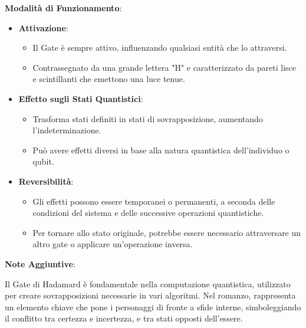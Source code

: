 \begin{tcolorbox}[fontupper=\tiny, fontlower=\Large,colback=white,colframe=black,title=\textbf{Gate di Hadamard}]
\begin{multicols}{2}
\textbf{Modalità di Funzionamento}:

\begin{itemize}
    \item \textbf{Attivazione}:
    \begin{itemize}
        \item Il Gate è sempre attivo, influenzando qualsiasi entità che lo attraversi.
        \item Contrassegnato da una grande lettera "H" e caratterizzato da pareti lisce e scintillanti che emettono una luce tenue.
    \end{itemize}
    \item \textbf{Effetto sugli Stati Quantistici}:
    \begin{itemize}
        \item Trasforma stati definiti in stati di sovrapposizione, aumentando l'indeterminazione.
        \item Può avere effetti diversi in base alla natura quantistica dell'individuo o qubit.
    \end{itemize}
    \item \textbf{Reversibilità}:
    \begin{itemize}
        \item Gli effetti possono essere temporanei o permanenti, a seconda delle condizioni del sistema e delle successive operazioni quantistiche.
        \item Per tornare allo stato originale, potrebbe essere necessario attraversare un altro gate o applicare un'operazione inversa.
    \end{itemize}
\end{itemize}

\textbf{Note Aggiuntive}:

Il Gate di Hadamard è fondamentale nella computazione quantistica, utilizzato per creare sovrapposizioni necessarie in vari algoritmi. Nel romanzo, rappresenta un elemento chiave che pone i personaggi di fronte a sfide interne, simboleggiando il conflitto tra certezza e incertezza, e tra stati opposti dell'essere.

\end{multicols}
\end{tcolorbox}


\vspace{0.5cm}

